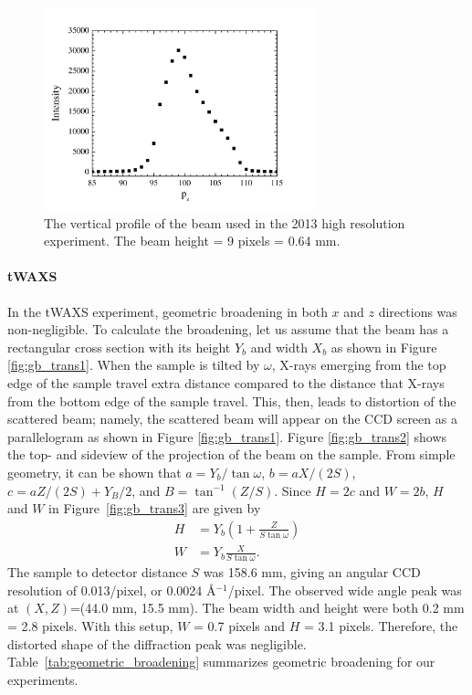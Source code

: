 \begin{figure}[htbp]
  \centering
  \includegraphics[width=0.7\textwidth]{figures/ripple/MMs/waxs/beamz_hr}
  \caption{The vertical profile of the beam used in the 2013 high resolution experiment.
  The beam height = 9 pixels = 0.64 mm.}
  \label{fig:nGIWAXS_beamz}
\end{figure} 

\paragraph{tWAXS}
In the tWAXS experiment, 
geometric broadening in both $x$ and $z$ directions was non-negligible.
To calculate the broadening, let us assume that the beam has a rectangular
cross section with its height $Y_b$ and width $X_b$ as shown in Figure 
\ref{fig:gb_trans1}. When the sample is tilted by $\omega$, X-rays emerging 
from the top edge of the sample travel extra distance compared to the distance 
that X-rays from the bottom edge of the sample travel. This, then, leads to 
distortion of the scattered beam; namely, the scattered beam will appear on 
the CCD screen as a parallelogram as shown in Figure 
\ref{fig:gb_trans1}. 
Figure \ref{fig:gb_trans2} shows the top- and sideview of the 
projection of the beam on the sample. From simple geometry, it can be shown 
that $a=Y_b/\tan\omega$, $b=aX/(2S)$, $c=aZ/(2S)+Y_B/2$, and $B=\tan^{-1}(Z/S)$. 
Since $H=2c$ and $W=2b$, $H$ and $W$ in Figure~\ref{fig:gb_trans3} are 
given by
\begin{align}
	H &= Y_b\left(1+\frac{Z}{S\tan\omega}\right)\\
	W &= Y_b\frac{X}{S\tan\omega}.
\end{align}
The sample to detector distance $S$ was 158.6 mm, giving an angular
CCD resolution of 0.013\textdegree/pixel, 
or 0.0024 \AA$^{-1}$/pixel.
The observed wide angle peak was at $(X,Z)$=(44.0 mm, 15.5 mm). 
The beam width and height were both 0.2 mm = 2.8 pixels.
With this setup, $W$ = 0.7 pixels and $H$ = 3.1 pixels. 
Therefore, the distorted shape of the diffraction peak was negligible.
Table~\ref{tab:geometric_broadening} summarizes geometric broadening for
our experiments.

